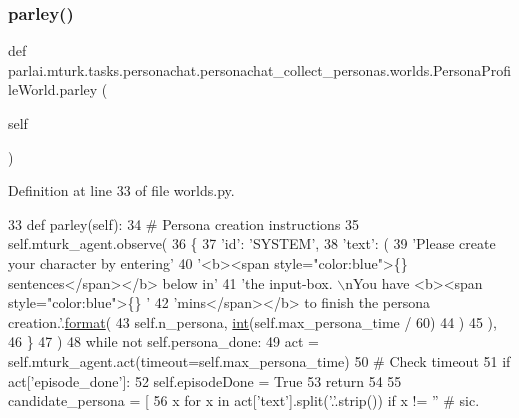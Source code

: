 \subsubsection{\texorpdfstring{parley()}{parley()}}
{\footnotesize\ttfamily def parlai.\+mturk.\+tasks.\+personachat.\+personachat\+\_\+collect\+\_\+personas.\+worlds.\+Persona\+Profile\+World.\+parley (\begin{DoxyParamCaption}\item[{}]{self }\end{DoxyParamCaption})}



Definition at line 33 of file worlds.\+py.


\begin{DoxyCode}
33     \textcolor{keyword}{def }parley(self):
34         \textcolor{comment}{# Persona creation instructions}
35         self.mturk\_agent.observe(
36             \{
37                 \textcolor{stringliteral}{'id'}: \textcolor{stringliteral}{'SYSTEM'},
38                 \textcolor{stringliteral}{'text'}: (
39                     \textcolor{stringliteral}{'Please create your character by entering'}
40                     \textcolor{stringliteral}{'<b><span style="color:blue">\{\} sentences</span></b> below in'}
41                     \textcolor{stringliteral}{'the input-box. \(\backslash\)nYou have <b><span style="color:blue">\{\} '}
42                     \textcolor{stringliteral}{'mins</span></b> to finish the persona creation.'}.\hyperlink{namespaceparlai_1_1chat__service_1_1services_1_1messenger_1_1shared__utils_a32e2e2022b824fbaf80c747160b52a76}{format}(
43                         self.n\_persona, \hyperlink{namespacelanguage__model_1_1eval__ppl_a7d12ee00479673c5c8d1f6d01faa272a}{int}(self.max\_persona\_time / 60)
44                     )
45                 ),
46             \}
47         )
48         \textcolor{keywordflow}{while} \textcolor{keywordflow}{not} self.persona\_done:
49             act = self.mturk\_agent.act(timeout=self.max\_persona\_time)
50             \textcolor{comment}{# Check timeout}
51             \textcolor{keywordflow}{if} act[\textcolor{stringliteral}{'episode\_done'}]:
52                 self.episodeDone = \textcolor{keyword}{True}
53                 \textcolor{keywordflow}{return}
54 
55             candidate\_persona = [
56                 x \textcolor{keywordflow}{for} x \textcolor{keywordflow}{in} act[\textcolor{stringliteral}{'text'}].split(\textcolor{stringliteral}{'.'}.strip()) \textcolor{keywordflow}{if} x != \textcolor{stringliteral}{''}  \textcolor{comment}{# sic.}

\end{DoxyCode}
